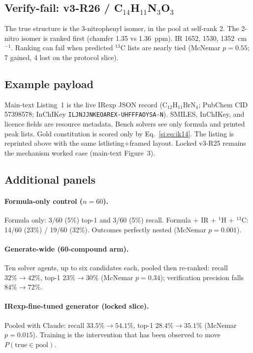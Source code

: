 \documentclass[11pt]{article}
\newcounter{listing}
\begin{document}
\subsection{Verify-fail: v3-R26 / C$_{14}$H$_{11}$N$_{3}$O$_{3}$}

The true structure is the 3-nitrophenyl isomer, in the pool at
self-rank 2.
The 2-nitro isomer is ranked first (chamfer 1.35 vs 1.36~ppm).
IR 1652, 1530, 1352~cm$^{-1}$.
Ranking can fail when predicted $^{13}$C lists are nearly tied
(McNemar $p{=}0.55$; 7 gained, 4 lost on the protocol slice).

\subsection{Example payload}

Main-text Listing~1 is the live IRexp JSON record
(C$_{12}$H$_{11}$BrN$_{4}$; PubChem CID 57398578;
InChIKey \texttt{ILJNJJNKEOAREX-UHFFFAOYSA-N}).
SMILES, InChIKey, and licence fields are resource metadata.
Bench solvers see only formula and printed peak lists.
Gold constitution is scored only by Eq.~\ref{si:eq:ik14}.
The listing is reprinted above with the same lstlisting$+$framed layout.
Locked v3-R25 remains the mechanism worked case (main-text Figure~3).

\subsection{Additional panels}

\paragraph{Formula-only control ($n{=}60$).}
Formula only: 3/60 (5\%) top-1 and 3/60 (5\%) recall.
Formula $+$ IR $+$ $^1$H $+$ $^{13}$C: 14/60 (23\%) / 19/60 (32\%).
Outcomes perfectly nested (McNemar $p{=}0.001$).

\paragraph{Generate-wide (60-compound arm).}
Ten solver agents, up to six candidates each, pooled then re-ranked:
recall $32\%\to 42\%$, top-1 $23\%\to 30\%$
(McNemar $p{=}0.34$); verification precision falls $84\%\to72\%$.

\paragraph{IRexp-fine-tuned generator (locked slice).}
Pooled with Claude: recall $33.5\%\to54.1\%$, top-1 $28.4\%\to35.1\%$
(McNemar $p{=}0.015$).
Training is the intervention that has been observed to move
$P(\mathrm{true}\in\mathrm{pool})$.
\end{document}
